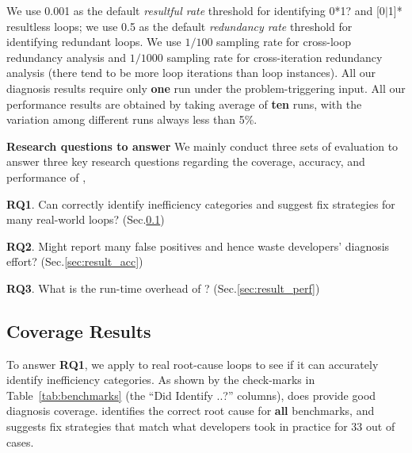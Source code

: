 %



We use 0.001 as the default \textit{resultful rate} threshold for identifying
0*1? 
and [0$|$1]* resultless loops; we use 
0.5 as the default \textit{redundancy rate} threshold for identifying redundant loops.
We use $1/100$ sampling rate for cross-loop redundancy analysis and 
$1/1000$ sampling rate for cross-iteration redundancy analysis
(there tend to be more loop iterations than loop instances).
All our diagnosis results require only \textbf{one} run under the 
problem-triggering input.
All our performance results are obtained by taking average of \textbf{ten} runs, 
with the variation among different runs always less than 5\%.


{\color{red}
\noindent\textbf{Research questions to answer}
We mainly conduct three sets of evaluation to answer three key research 
questions regarding the coverage, accuracy, and performance of \Tool, 

\textbf{RQ1}.
Can \Tool correctly identify inefficiency categories and suggest fix 
strategies for many real-world loops? (Sec.\ref{sec:coverage})

\textbf{RQ2}.
Might \Tool report many false positives and hence waste developers' diagnosis
effort? (Sec.\ref{sec:result_acc})

\textbf{RQ3}.
What is the run-time overhead of \Tool? (Sec.\ref{sec:result_perf})
}


\subsection{Coverage Results}
\label{sec:coverage}
{\color{red}
To answer \textbf{RQ1}, we apply \Tool to real root-cause loops to see if 
it can accurately identify inefficiency categories.
As shown by the check-marks in Table~\ref{tab:benchmarks}
(the ``Did \Tool Identify ..?'' columns), 
\Tool does provide good diagnosis coverage.
}
\Tool identifies the correct root cause for \textbf{all} \allbugs benchmarks, and 
suggests fix strategies that match what developers took in practice
for 33 out of \allbugs cases. 

